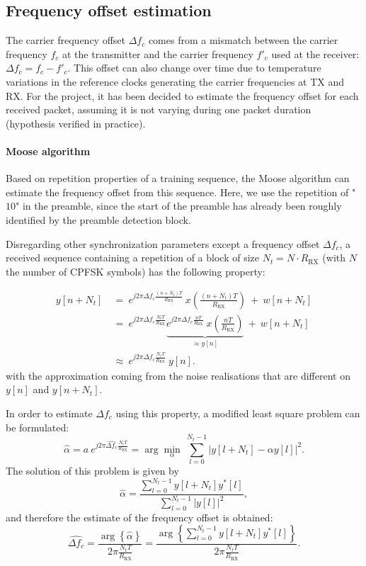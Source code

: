 \subsection{Frequency offset estimation}
The carrier frequency offset $\Delta f_c$ comes from a mismatch between the carrier frequency $f_c$ at the transmitter and the carrier frequency $f'_c$ used at the receiver: $\Delta f_c=f_c-f'_c$. This offset can also change over time due to temperature variations in the reference clocks generating the carrier frequencies at TX and RX. For the project, it has been decided to estimate the frequency offset for each received packet, assuming it is not varying during one packet duration (hypothesis verified in practice).

\paragraph{Moose algorithm} Based on repetition properties of a training sequence, the Moose algorithm can estimate the frequency offset from this sequence. Here, we use the repetition of "$10$" in the preamble, since the start of the preamble has already been roughly identified by the preamble detection block.

Disregarding other synchronization parameters except a frequency offset $\Delta f_c$, a received sequence containing a repetition of a block of size $N_t=N\cdot R_{\text{RX}}$ (with $N$ the number of CPFSK symbols) has the following property:

\begin{align*}
    y[n+N_t] \:&=\:e^{j2\pi \Delta f_c \frac{(n+N_t)T}{R_{\text{RX}}}} \:x\left(\frac{(n+N_t)T}{R_{\text{RX}}}\right) \:+\: w[n+N_t]\\
    &=\:e^{j2\pi \Delta f_c \frac{N_tT}{R_{\text{RX}}}} \underbrace{e^{j2\pi \Delta f_c \frac{nT}{R_{\text{RX}}}}\:x\left(\frac{nT}{R_{\text{RX}}}\right)}_{\approx y[n]} \:+\: w[n+N_t]\\
    &\approx \:e^{j2\pi \Delta f_c \frac{N_tT}{R_{\text{RX}}}}\: y[n].
\end{align*}
with the approximation coming from the noise realisations that are different on $y[n]$ and $y[n+N_t]$.

In order to estimate $\Delta f_c$ using this property, a modified least square problem can be formulated:
\begin{equation*}
    \hat{\alpha} = a \:e^{j2\pi \widehat{\Delta f_c} \frac{N_tT}{R_{\text{RX}}}} = \arg\min_{\alpha} \: \sum_{l=0}^{N_t-1} \left|y[l+N_t] - \alpha y[l]\right|^2.
\end{equation*}
The solution of this problem is given by
\begin{equation*}
    \hat{\alpha} =  \frac{\sum_{l=0}^{N_t-1} y[l+N_t]y^*[l]}{\sum_{l=0}^{N_t-1} |y[l]|^2},
\end{equation*}
and therefore the estimate of the frequency offset is obtained:
\begin{equation*}
     \widehat{\Delta f_c} = \frac{\arg\left\{\hat{\alpha}\right\}}{2 \pi \frac{N_tT}{R_{\text{RX}}}} = \frac{\arg\left\{\sum_{l=0}^{N_t-1} y[l+N_t]y^*[l]\right\}}{2 \pi \frac{N_tT}{R_{\text{RX}}}}.
\end{equation*}

